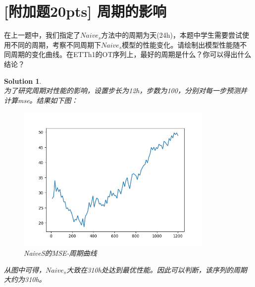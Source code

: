 \documentclass[a4paper,UTF8]{article}
\numberwithin{equation}{section}
\newtheorem*{mySol}{Solution}
\begin{document}
\section{[附加题20pts] 周期的影响}
在上一题中，我们指定了$Naive_s$方法中的周期为天(24h)，本题中学生需要尝试使用不同的周期，考察不同周期下$Naive_s$模型的性能变化。请绘制出模型性能随不同周期的变化曲线。在ETTh1的OT序列上，最好的周期是什么？你可以得出什么结论？
\begin{mySol}
~\\
为了研究周期对性能的影响，设置步长为12h，步数为100，分别对每一步预测并计算mse。结果如下图：
\begin{figure}[htbp]
	\centering
	\includegraphics[width=0.85\textwidth]{4}
	\caption{NaiveS的MSE-周期曲线}
\end{figure}
\newpage
从图中可得，$Naive_s$大致在310h处达到最优性能。因此可以判断，该序列的周期大约为310h。
\end{mySol}
\end{document}
